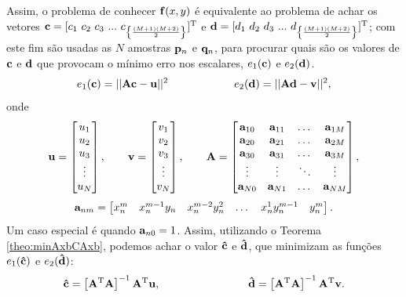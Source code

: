 \begin{theorem}
Assim, o problema de conhecer $\VECTOR{f}(x,y)$ é equivalente ao 
problema de achar os vetores 
$\VECTOR{c}=[c_1~c_2~c_3~...~c_{\left\{ \frac{(M+1)(M+2)}{2}\right\}} ]^{\transpose}$ e
$\VECTOR{d}=[d_1~d_2~d_3~...~d_{\left\{ \frac{(M+1)(M+2)}{2}\right\}} ]^{\transpose}$;
com este fim são usadas as $N$ amostras $\VECTOR{p}_n$ e $\VECTOR{q}_n$,
para  procurar quais são os valores de $\VECTOR{c}$ e $\VECTOR{d}$
que provocam o mínimo erro nos escalares, 
$e_1(\VECTOR{c})$  e $e_2(\VECTOR{d})$.%
\begin{equation}\label{eq:mapeamento:3}
 e_1(\VECTOR{c})=||\MATRIX{A}\VECTOR{c}-\VECTOR{u}||^2 \qquad\qquad\qquad  e_2(\VECTOR{d})=||\MATRIX{A}\VECTOR{d}-\VECTOR{v}||^2,
\end{equation}
onde 
\begin{equation}\label{eq:mapeamento:4}
\VECTOR{u}=
\begin{bmatrix}
u_1 \\
u_2 \\
u_3 \\
\vdots \\
u_{N}
\end{bmatrix},
\qquad
\VECTOR{v}=
\begin{bmatrix}
v_1 \\
v_2 \\
v_3 \\
\vdots \\
v_{N}
\end{bmatrix},
\qquad
\MATRIX{A}=
\begin{bmatrix}
\VECTOR{a}_{10}     & \VECTOR{a}_{11}     & \dots  & \VECTOR{a}_{1M} \\
\VECTOR{a}_{20}     & \VECTOR{a}_{21}     & \dots  & \VECTOR{a}_{2M} \\
\VECTOR{a}_{30}     & \VECTOR{a}_{31}     & \dots  & \VECTOR{a}_{3M} \\
\vdots              & \vdots              & \ddots & \vdots \\
\VECTOR{a}_{N0} & \VECTOR{a}_{N1} & \dots  & \VECTOR{a}_{NM}
\end{bmatrix},
\end{equation}
\begin{equation}\label{eq:mapeamento:5}
\VECTOR{a}_{nm}=
\begin{bmatrix}
x^m_n  & x^{m-1}_n y_n  & x^{m-2}_n y^2_n    & \dots  & x^{1}_n y^{m-1}_n &  y^m_n 
\end{bmatrix}.
\end{equation}
Um caso especial é quando $\VECTOR{a}_{n0}=1$.
Assim, utilizando o Teorema \ref{theo:minAxbCAxb},
podemos achar o valor $\VECTOR{\hat{c}}$ e $\VECTOR{\hat{d}}$,
que minimizam as funções  $e_1(\VECTOR{\hat{c}})$  e $e_2(\VECTOR{\hat{d}})$:
\begin{equation}\label{eq:mapeamento:6}
\VECTOR{\hat{c}}=
\left[ \MATRIX{A}^{\transpose}  \MATRIX{A} \right]^{-1}\MATRIX{A}^{\transpose} \VECTOR{u},
\qquad \qquad \qquad \qquad
\VECTOR{\hat{d}}=
\left[ \MATRIX{A}^{\transpose}  \MATRIX{A} \right]^{-1}\MATRIX{A}^{\transpose} \VECTOR{v}.
\end{equation}


\end{theorem}
